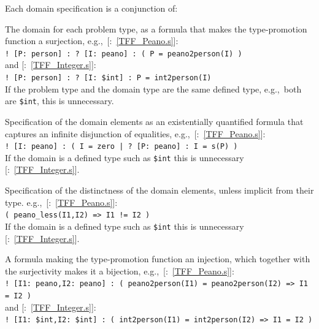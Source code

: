 \documentclass{easychair}
\newcommand{\smalltt}[1]{\small \texttt{#1}}
\newcommand{\example}{{\scriptsize \faFile[regular]}}
\newenvironment{packed_itemize}{
\vspace*{-0.3em}
\begin{itemize}
\setlength{\partopsep}{0pt}
\setlength{\itemsep}{1pt}
\setlength{\parskip}{0pt}
\setlength{\parsep}{0pt}
}{\end{itemize}}
\begin{document}
Each domain specification is a conjunction of:
\begin{packed_itemize}
\item The domain for each problem type, as a formula that makes the type-promotion function a 
      surjection, e.g.,~[\example{}:~\ref{TFF_Peano.s}]:\\
      \hspace*{0.5cm}\smalltt{! [P: person] : ? [I: peano] : ( P = peano2person(I) )}\\
      and [\example{}:~\ref{TFF_Integer.s}]:\\
      \hspace*{0.5cm}\smalltt{! [P: person] : ? [I: \$int] : P = int2person(I)}\\
      If the problem type and the domain type are the same defined type, e.g.,~both are 
      \smalltt{\$int}, this is unnecessary.
\item Specification of the domain elements as an existentially quantified formula that captures an
      infinite disjunction of equalities, e.g.,~[\example{}:~\ref{TFF_Peano.s}]:\\
      \hspace*{0.5cm}\smalltt{! [I: peano] : ( I = zero | ? [P: peano] : I = s(P) )} \\
      If the domain is a defined type such as \smalltt{\$int} this is unnecessary
      [\example{}:~\ref{TFF_Integer.s}].
\item Specification of the distinctness of the domain elements, unless implicit from their type.
      e.g.,~[\example{}:~\ref{TFF_Peano.s}]:\\
      \hspace*{0.5cm}\smalltt{( peano\_less(I1,I2) => I1 != I2 )}\\
      If the domain is a defined type such as \smalltt{\$int} this is unnecessary
      [\example{}:~\ref{TFF_Integer.s}].
\item A formula making the type-promotion function an injection, which together with the 
      surjectivity makes it a bijection, e.g.,~[\example{}:~\ref{TFF_Peano.s}]:\\
      \hspace*{0.5cm}\smalltt{! [I1: peano,I2: peano] : ( peano2person(I1) = peano2person(I2) => I1 = I2 )}\\
      and [\example{}:~\ref{TFF_Integer.s}]:\\
      \hspace*{0.5cm}\smalltt{! [I1: \$int,I2: \$int] : ( int2person(I1) = int2person(I2) => I1 = I2 )}
\end{packed_itemize}
\end{document}
